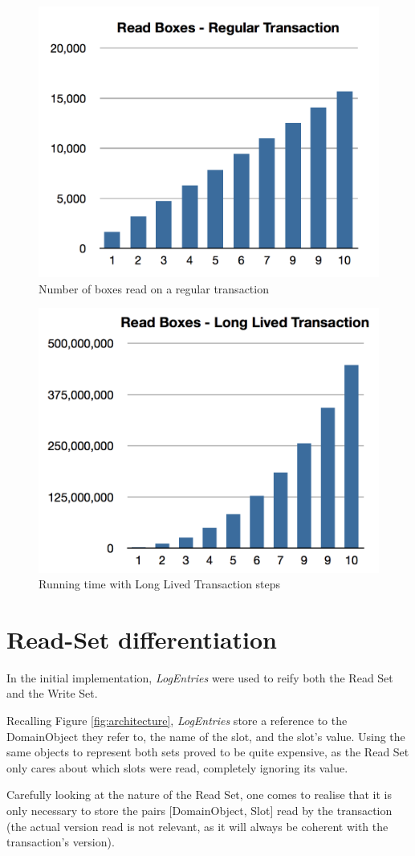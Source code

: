 \begin{figure}
\centering
\includegraphics[width=0.6\linewidth]{reg-box}
\caption{Number of boxes read on a regular transaction}
\label{fig:reg-box}
\end{figure}

\begin{figure}
\centering
\includegraphics[width=0.6\linewidth]{long-box-v1}
\caption{Running time with Long Lived Transaction steps}
\label{fig:long-box-v1}
\end{figure}

\section{Read-Set differentiation}

In the initial implementation, {\it LogEntries} were used to reify
both the Read Set and the Write Set.

Recalling Figure \ref{fig:architecture}, {\it LogEntries} store a
reference to the DomainObject they refer to, the name of the slot, and
the slot's value. Using the same objects to represent both sets proved
to be quite expensive, as the Read Set only cares about which slots
were read, completely ignoring its value.

Carefully looking at the nature of the Read Set, one comes to realise
that it is only necessary to store the pairs [DomainObject, Slot] read
by the transaction (the actual version read is not relevant, as it
will always be coherent with the transaction's version).

